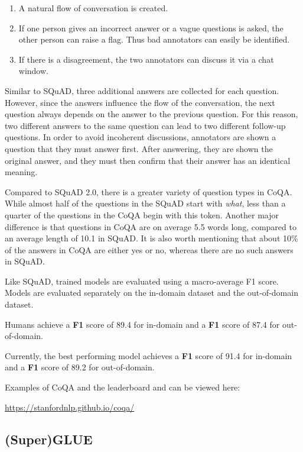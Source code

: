 \documentclass[]{krantz}
\providecommand{\tightlist}{%
  \setlength{\itemsep}{0pt}\setlength{\parskip}{0pt}}
\begin{document}
\begin{enumerate}
\def\labelenumi{\arabic{enumi}.}
\tightlist
\item
  A natural flow of conversation is created.
\item
  If one person gives an incorrect answer or a vague questions is asked, the other person can raise a flag. Thus bad annotators can easily be identified.
\item
  If there is a disagreement, the two annotators can discuss it via a chat window.
\end{enumerate}

Similar to SQuAD, three additional answers are collected for each question. However, since the answers influence the flow of the conversation, the next question always depends on the answer to the previous question. For this reason, two different answers to the same question can lead to two different follow-up questions. In order to avoid incoherent discussions, annotators are shown a question that they must answer first. After answering, they are shown the original answer, and they must then confirm that their answer has an identical meaning.

Compared to SQuAD 2.0, there is a greater variety of question types in CoQA. While almost half of the questions in the SQuAD start with \emph{what}, less than a quarter of the questions in the CoQA begin with this token. Another major difference is that questions in CoQA are on average 5.5 words long, compared to an average length of 10.1 in SQuAD. It is also worth mentioning that about 10\% of the answers in CoQA are either yes or no, whereas there are no such answers in SQuAD.

Like SQuAD, trained models are evaluated using a macro-average F1 score. Models are evaluated separately on the in-domain dataset and the out-of-domain dataset. \citep{coqa2019}

Humans achieve a \textbf{F1} score of 89.4 for in-domain and a \textbf{F1} score of 87.4 for out-of-domain.

Currently, the best performing model achieves a \textbf{F1} score of 91.4 for in-domain and a \textbf{F1} score of 89.2 for out-of-domain.

Examples of CoQA and the leaderboard and can be viewed here:

\center \url{https://stanfordnlp.github.io/coqa/}

\flushleft

\hypertarget{superglue}{%
\subsection{(Super)GLUE}\label{superglue}}
\end{document}
